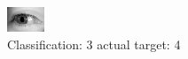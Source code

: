 \begin{figure}[h!]
\begin{center}
\includegraphics[width=0.60\columnwidth]{figures/ID3166_class_3_target_4.png}
\end{center}
\caption{ Classification: 3 actual target: 4}
\label{fig:ID3166_class_3_target_4}
\end{figure}

